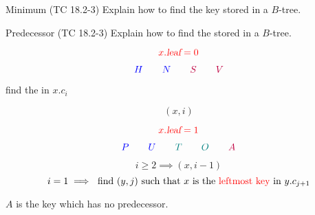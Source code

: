 
\begin{frame}{}
  \begin{exampleblock}{Minimum (TC 18.2-3)}
    Explain how to find the  key stored in a $B$-tree. 
  \end{exampleblock}


  \pause
  \vspace{0.30cm}
  \begin{center}
  \end{center}
\end{frame}

\begin{frame}{}
  \begin{exampleblock}{Predecessor (TC 18.2-3)}
    Explain how to find the  stored in a $B$-tree.
  \end{exampleblock}

  \pause
  \begin{center}
  \end{center}

  \pause
  \[
    \textcolor{red}{x.\textsl{leaf} = 0}
  \]

  \pause
  \vspace{-0.30cm}
  \[
    \textcolor{blue}{H \qquad N} \qquad \textcolor{purple}{S \qquad V}
  \]

  \pause
  \vspace{0.20cm}
  \begin{center}
    find the  in $x.c_{i}$
  \end{center}
\end{frame}

\begin{frame}{}
  \[
    (x, i)
  \]

  \[
    \textcolor{red}{x.\textsl{leaf} = 1}
  \]

  \vspace{-0.30cm}
  \[
    \textcolor{blue}{P \qquad U \qquad} \textcolor{teal}{T\qquad O \qquad} \textcolor{purple}{A}
  \]

  \pause
  \[
    i \ge 2 \implies (x, i-1)
  \]
  \[
    i = 1 \implies \text{ find $(y, j)$ such that $x$ is the \textcolor{red}{leftmost key} in $y.c_{j + 1}$}
  \]

  \pause
  \begin{center}
    $A$ is the  key which has no predecessor.
  \end{center}
\end{frame}

\begin{frame}{}
  
\end{frame}
